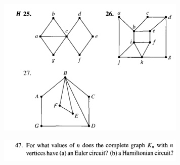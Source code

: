 \documentclass{article}
\begin{document}
\begin{figure}
\centering
\includegraphics[width=90mm]{13}
\end{figure}

\begin{figure}
\centering
\includegraphics[width=90mm]{14}
\end{figure}
\end{document}
